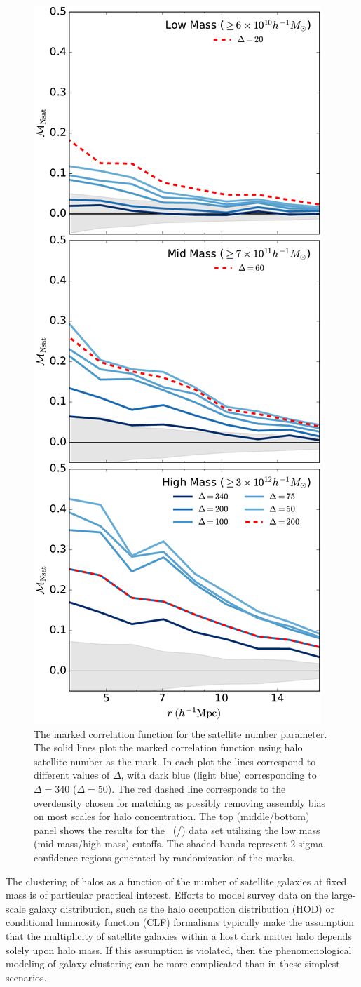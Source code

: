\documentclass[usenatbib,fleqn]{mnras}
\begin{document}
\begin{figure}
	\centering
	\includegraphics[width=.4\textwidth]{all_mcf_nsat.pdf}
	\caption{
The marked correlation function for the satellite number parameter. The solid lines plot the marked correlation function using halo satellite number as the mark. In each plot the lines correspond to different values of $\Delta$, with dark blue (light blue) corresponding to $\Delta = 340$ ($\Delta = 50$). The red dashed line corresponds to the overdensity chosen for matching as possibly removing assembly bias on most scales for halo concentration. The top (middle/bottom) panel shows the results for the
\simA \ (\simB /\simC) data set utilizing the low mass (mid mass/high mass) cutoffs. The shaded bands represent 2-sigma confidence regions generated by randomization of the marks. }
	\label{fig:cc_mcf_nsat}
\end{figure}


The clustering of halos as a function of the number of satellite galaxies at fixed mass is of 
particular practical interest. Efforts to model survey data on the large-scale galaxy distribution, 
such as the halo occupation distribution (HOD) or conditional luminosity function (CLF) formalisms 
typically make the assumption that the multiplicity of satellite galaxies within a host dark matter 
halo depends solely upon halo mass. If this assumption is violated, then the phenomenological 
modeling of galaxy clustering can be more complicated than in these simplest scenarios.
\end{document}
